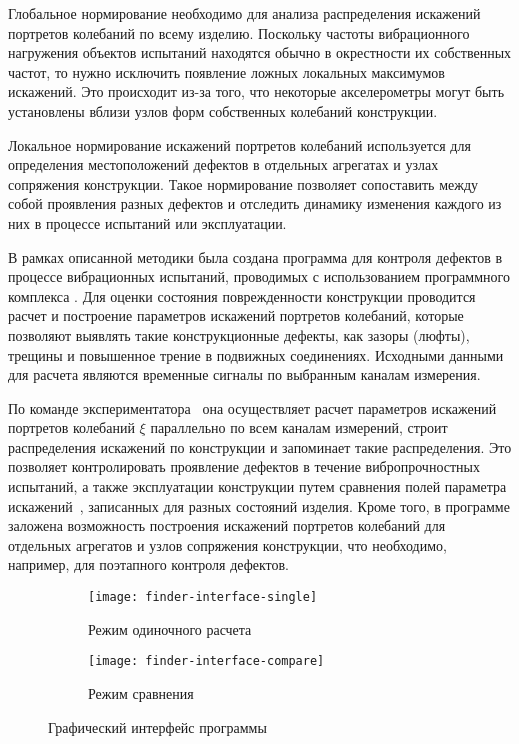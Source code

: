 Глобальное нормирование необходимо для анализа распределения искажений портретов колебаний по всему изделию. Поскольку частоты вибрационного нагружения объектов испытаний находятся обычно в окрестности их собственных частот, то нужно исключить появление ложных локальных максимумов искажений. Это происходит из-за того, что некоторые акселерометры могут быть установлены вблизи узлов форм собственных колебаний конструкции.

Локальное нормирование искажений портретов колебаний используется для определения местоположений дефектов в отдельных агрегатах и узлах сопряжения конструкции. Такое нормирование позволяет сопоставить между собой проявления разных дефектов и отследить динамику изменения каждого из них в процессе испытаний или эксплуатации.

В рамках описанной методики была создана программа для контроля дефектов в процессе вибрационных испытаний, проводимых с использованием программного комплекса . Для оценки состояния поврежденности конструкции проводится расчет и построение параметров искажений портретов колебаний, которые позволяют выявлять такие конструкционные дефекты, как зазоры (люфты), трещины и повышенное трение в подвижных соединениях. Исходными данными для расчета являются временные сигналы по выбранным каналам измерения. 

По команде экспериментатора~ она осуществляет расчет параметров искажений портретов колебаний $ \xi $ параллельно по всем каналам измерений, строит распределения искажений по конструкции и запоминает такие распределения. Это позволяет контролировать проявление дефектов в течение вибропрочностных испытаний, а также эксплуатации конструкции путем сравнения полей параметра искажений~, записанных для разных состояний изделия. Кроме того, в программе заложена возможность построения искажений портретов колебаний для отдельных агрегатов и узлов сопряжения конструкции, что необходимо, например, для поэтапного контроля дефектов.

\def\sfDefects{0.49\textwidth}

\begin{figure}[!htb]
	\centering
	\begin{subfigure}[t]{\sfDefects}
		\texttt{[image: finder-interface-single]}
		\caption{Режим одиночного расчета} \label{subfig:finder-interface-single}
	\end{subfigure}
	\hfill
	\begin{subfigure}[t]{\sfDefects}
		\texttt{[image: finder-interface-compare]} 
		\caption{Режим сравнения} \label{subfig:finder-interface-compare}
	\end{subfigure}
    \caption{Графический интерфейс программы~} 
\end{figure}

